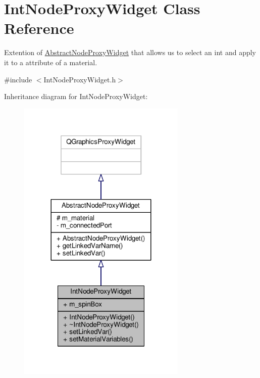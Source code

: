 \hypertarget{class_int_node_proxy_widget}{\section{Int\-Node\-Proxy\-Widget Class Reference}
\label{class_int_node_proxy_widget}
}


Extention of \hyperlink{class_abstract_node_proxy_widget}{Abstract\-Node\-Proxy\-Widget} that allows us to select an int and apply it to a attribute of a material.  




{\ttfamily \#include $<$Int\-Node\-Proxy\-Widget.\-h$>$}



Inheritance diagram for Int\-Node\-Proxy\-Widget\-:
\nopagebreak
\begin{figure}[H]
\begin{center}
\leavevmode
\includegraphics[width=228pt]{class_int_node_proxy_widget__inherit__graph}
\end{center}
\end{figure}


